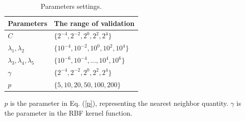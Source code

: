 \documentclass[a4paper]{cas-sc}
\begin{document}
\begin{table}[ht]
\centering
\renewcommand\arraystretch{1}
\setlength{\abovecaptionskip}{2pt}
\caption{Parameters settings.}
\begin{tabular}{p{3cm}<{\centering}p{4cm}<{\centering}}
\toprule
Parameters & The range of validation \\
\midrule
  $C$ & $\{2^{-4}, 2^{-2}, 2^{0}, 2^2, 2^4\}$  \\

  $\lambda_1, \lambda_2$ & $\{10^{-4}, 10^{-2}, 10^{0}, 10^2, 10^4\}$  \\

 $\lambda_3,\lambda_4,\lambda_5$ & $\{10^{-6}, 10^{-4},\ldots, 10^4, 10^{6}\}$  \\

 $\gamma$ & $\{2^{-4}, 2^{-2}, 2^{0}, 2^2, 2^4\}$  \\

 $p$ & $\{5,10,20,50,100,200\}$  \\
\bottomrule
\end{tabular}
\begin{tablenotes}
     \item $p$ is the parameter in Eq. (\ref{p}), representing the nearest neighbor quantity. $\gamma$ is the parameter in the RBF kernel function.
\end{tablenotes}
\label{setting}
\end{table}
\end{document}
